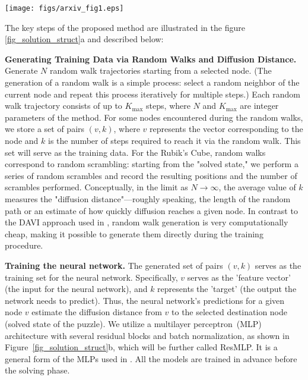 \begin{figure*}
\centering
\texttt{[image: figs/arxiv\_fig1.eps]}
\caption{Proposed ML solution for Rubik's cube solving: (a)~proposed multi-agent solver's process flow; (c)~ResMLP neural network architecture; (b)~an example of beam search pathfinding on 3$\times$3$\times$3 cube's graph using $W=40$.}
\label{fig_solution_struct}
\end{figure*}

The key steps of the proposed method are illustrated in the figure \ref{fig_solution_struct}a and described below:

 {\bf  Generating Training Data via Random Walks and Diffusion Distance.} Generate $N$ random walk trajectories starting from a selected node. (The generation of a random walk is a simple process: select a random neighbor of the current node and repeat this process iteratively for multiple steps.) Each random walk trajectory consists of up to $K_{\text{max}}$ steps, where $N$ and $K_{\text{max}}$ are integer parameters of the method. For some nodes encountered during the random walks, we store a set of pairs $(v, k)$, where $v$ represents the vector corresponding to the node and $k$ is the number of steps required to reach it via the random walk. This set will serve as the training data. For the Rubik's Cube, random walks correspond to random scrambling: starting from the "solved state," we perform a series of random scrambles and record the resulting positions and the number of scrambles performed. Conceptually, in the limit as $N \to \infty$, the average value of $k$ measures the "diffusion distance"---roughly speaking, the length of the random path or an estimate of how quickly diffusion reaches a given node. In contrast to the DAVI approach used in \cite{agostinelli2019solving}, random walk generation is very computationally cheap, making it possible to generate them directly during the training procedure.
    
    
 {\bf Training the neural network.} The generated set of pairs $(v, k)$ serves as the training set for the neural network. Specifically, $v$ serves as the 'feature vector' (the input for the neural network), and $k$ represents the 'target' (the output the network needs to predict). Thus, the neural network's predictions for a given node $v$ estimate the diffusion distance from $v$ to the selected destination node (solved state of the puzzle). We utilize a multilayer perceptron~(MLP) architecture with several residual blocks and batch normalization, as shown in Figure~\ref{fig_solution_struct}b, which will be further called ResMLP. It is a general form of the MLPs used in \cite{agostinelli2019solving,takano2023selfsupervision}. All the models are trained in advance before the solving phase.

